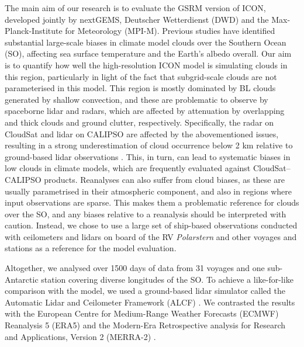\documentclass[12pt,a4paper]{article}
\begin{document}
The main aim of our research is to evaluate the GSRM version of ICON, developed
jointly by nextGEMS, Deutscher Wetterdienst (DWD) and the Max-Planck-Institute
for Meteorology (MPI-M). Previous studies have identified substantial
large-scale biases in climate model clouds over the Southern Ocean (SO),
affecting sea surface temperature and the Earth’s albedo overall. Our aim is to
quantify how well the high-resolution ICON model is simulating clouds in this
region, particularly in light of the fact that subgrid-scale clouds are not
parameterised in this model. This region is mostly dominated by BL clouds
generated by shallow convection, and these are problematic to observe by
spaceborne lidar and radars, which are affected by attenuation by overlapping
and thick clouds and ground clutter, respectively.  Specifically, the radar on
CloudSat and lidar on CALIPSO are affected by the abovementioned issues,
resulting in a strong underestimation of cloud occurrence below 2 km relative
to ground-based lidar observations \citep{mcerlich2021}.  This, in turn, can
lead to systematic biases in low clouds in climate models, which are frequently
evaluated against CloudSat--CALIPSO products. Reanalyses can also suffer from
cloud biases, as these are usually parametrised in their atmospheric component,
and also in regions where input observations are sparse.  This makes them a
problematic reference for clouds over the SO, and any biases relative to a
reanalysis should be interpreted with caution. Instead, we chose to use a large
set of ship-based observations conducted with ceilometers and lidars on board
of the RV \emph{Polarstern} and other voyages and stations as a reference for
the model evaluation.

Altogether, we analysed over 1500 days of data from 31 voyages and one
sub-Antarctic station covering diverse longitudes of the SO. To achieve a
like-for-like comparison with the model, we used a ground-based lidar simulator
called the Automatic Lidar and Ceilometer Framework (ALCF) \citep{kuma2021}. We
contrasted the results with the European Centre for Medium-Range Weather
Forecasts (ECMWF) Reanalysis 5 (ERA5) \citep{era5} and the Modern-Era
Retrospective analysis for Research and Applications, Version 2 (MERRA-2)
\citep{gelaro2017}.
\end{document}
